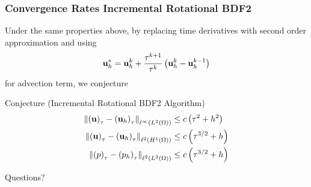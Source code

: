 \documentclass{beamer}
\begin{document}
\begin{frame}
  \frametitle{Convergence Rates Incremental Rotational BDF2} 
  Under the same properties above, by replacing time derivatives with second order approximation and using
  \begin{equation*}
    \textbf{u}^{*}_h = \textbf{u}_h^{k} + \frac{\tau^{k+1}}{\tau^{k}}\left( \textbf{u}_h^{k} - \textbf{u}_h^{k-1} \right)
  \end{equation*}
  for advection term, we conjecture
  \begin{block}{Conjecture (Incremental Rotational BDF2 Algorithm)}
    \begin{align*}
      \left\|\left(\textbf{u}\right)_{\tau} - \left(\textbf{u}_h\right)_{\tau}\right\|_{\ell^{\infty}\left(L^2(\Omega)\right)} &\leq c\left( \tau^2 + h^2\right)\\
      \left\|\left(\textbf{u}\right)_{\tau} - \left(\textbf{u}_h\right)_{\tau}\right\|_{\ell^{2}\left(H^1(\Omega)\right)} &\leq c\left(\tau^{3/2} + h \right)\\
      \left\|\left(p\right)_{\tau} - \left(p_h\right)_{\tau}\right\|_{\ell^{2}\left(L^2(\Omega)\right)} &\leq c\left(\tau^{3/2} + h \right)
    \end{align*}
  \end{block}
  
\end{frame}

\begin{frame}[c]
    \begin{center}
      \huge Questions?
    \end{center}
\end{frame}
\end{document}
